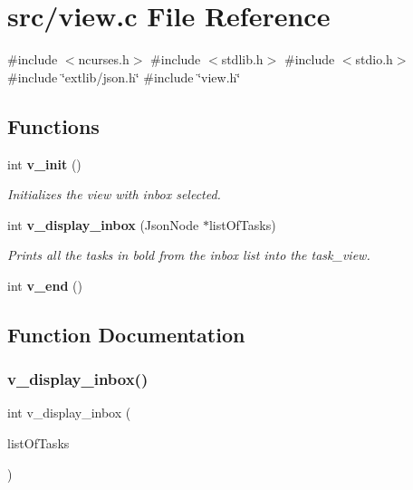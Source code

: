 \section{src/view.c File Reference}
\label{view_8c}
{\ttfamily \#include $<$ncurses.\+h$>$}\newline
{\ttfamily \#include $<$stdlib.\+h$>$}\newline
{\ttfamily \#include $<$stdio.\+h$>$}\newline
{\ttfamily \#include \char`\"{}extlib/json.\+h\char`\"{}}\newline
{\ttfamily \#include \char`\"{}view.\+h\char`\"{}}\newline
\subsection*{Functions}
\begin{DoxyCompactItemize}
\item 
int \textbf{ v\+\_\+init} ()
\begin{DoxyCompactList}\small\item\em Initializes the view with inbox selected. \end{DoxyCompactList}\item 
int \textbf{ v\+\_\+display\+\_\+inbox} (Json\+Node $\ast$list\+Of\+Tasks)
\begin{DoxyCompactList}\small\item\em Prints all the tasks in bold from the inbox list into the task\+\_\+view. \end{DoxyCompactList}\item 
int \textbf{ v\+\_\+end} ()
\end{DoxyCompactItemize}


\subsection{Function Documentation}
\mbox{\label{view_8c_a85e0e2098c355cce2ec6fde791d5d61a}} 
\subsubsection{v\+\_\+display\+\_\+inbox()}
{\footnotesize\ttfamily int v\+\_\+display\+\_\+inbox (\begin{DoxyParamCaption}\item[{Json\+Node $\ast$}]{list\+Of\+Tasks }\end{DoxyParamCaption})}



